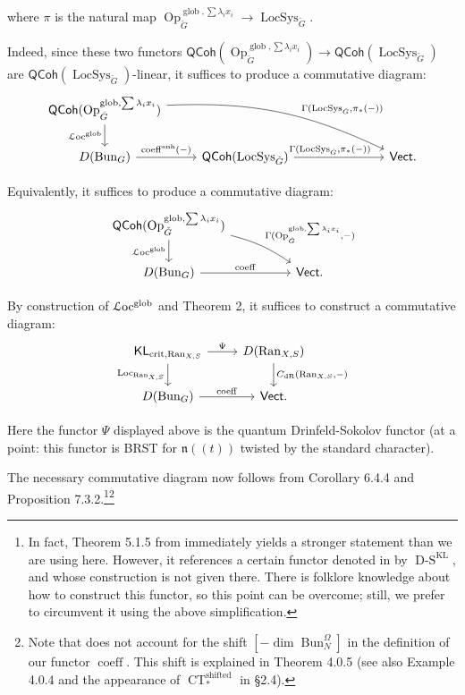 \documentclass[reqno,11pt]{amsart}
\numberwithin{equation}{subsection}
\theoremstyle{remark}
\newcommand{\Loc}{\on{Loc}}
\newcommand{\sL}{{\EuScript L}}
\newcommand{\fn}{{\mathfrak n}}
\newcommand{\on}{\operatorname}
\newcommand{\Vect}{\mathsf{Vect}}
\newcommand{\Bun}{\on{Bun}}
\newcommand{\LocSys}{\on{LocSys}}
\newcommand{\Op}{\on{Op}}
\newcommand{\QCoh}{\mathsf{QCoh}}
\newcommand{\coeff}{\on{coeff}}
\newcommand{\enh}{\on{enh}}
\newcommand{\Ran}{\on{Ran}}
\newcommand{\crit}{\on{crit}}
\newcommand{\KL}{\mathsf{KL}}
\newcommand{\dR}{\on{dR}}
\begin{document}
\noindent where $\pi$ is the natural map 
$\Op_{\check{G}}^{\on{glob},\sum \lambda_i x_i} \to \LocSys_{\check{G}}$.

Indeed, since these two functors 
$\QCoh(\Op_{\check{G}}^{\on{glob},\sum \lambda_i x_i}) \to 
\QCoh(\LocSys_{\check{G}})$ are $\QCoh(\LocSys_{\check{G}})$-linear,
it suffices to produce a commutative diagram:
%
\[
\begin{tikzcd}
\QCoh(\Op_{\check{G}}^{\on{glob},\sum \lambda_i x_i})
\arrow[d,swap,"\sL\text{oc}^{\on{glob}}"]
\arrow[drrrr, bend left = 14, pos = .6, "{\Gamma(\LocSys_{\check{G}},\pi_*(-))}"]
\\
D(\Bun_G)
\arrow[r,"{\coeff^{\enh}(-)}"]
&
\QCoh(\LocSys_{\check{G}})
\arrow[rrr,pos = .4,"{\Gamma(\LocSys_{\check{G}},\pi_*(-))}"]
&&&
\Vect.
\end{tikzcd}
\]

\noindent Equivalently, it suffices to produce a commutative diagram:
%
\[
\begin{tikzcd}
\QCoh(\Op_{\check{G}}^{\on{glob},\sum \lambda_i x_i})
\arrow[d,swap,"\sL\text{oc}^{\on{glob}}"]
\arrow[drr, bend left = 10, "{\Gamma(\Op_{\check{G}}^{\on{glob},\sum \lambda_i x_i},-)}"]
\\
D(\Bun_G)
\arrow[rr,"{\coeff}"]
&&
\Vect.
\end{tikzcd}
\]

By construction of $\sL\text{oc}^{\on{glob}}$ and 
\cite{fg-weyl} Theorem 2,
it suffices to construct a commutative diagram:
%
\[
\begin{tikzcd}
\KL_{\crit,\Ran_{X,S}}
\arrow[d,swap,"\Loc_{\Ran_{X,S}}"]
\arrow[r, "\Psi"]
&
D(\Ran_{X,S})
\arrow[d,"{C_{\dR}(\Ran_{X,S},-)}"]
\\
D(\Bun_G)
\arrow[r,"{\coeff}"]
&
\Vect.
\end{tikzcd}
\]

\noindent Here the functor $\Psi$ displayed above is the quantum Drinfeld-Sokolov
functor (at a point: this functor is BRST for $\fn((t))$ twisted by the standard 
character). 

The necessary commutative diagram now follows from 
\cite{dennis-opers} Corollary 6.4.4 and Proposition 7.3.2.\footnote{In fact,
Theorem 5.1.5 from \cite{dennis-opers} immediately yields a stronger
statement than we are using here. However, it references a certain
functor denoted in 
\cite{dennis-opers} by $\on{D-S}^{\on{KL}}$, and whose construction is not given
there. There is folklore knowledge about how to construct this functor,
so this point can be overcome; still, we prefer to circumvent it using 
the above simplification.}\footnote{Note that \cite{dennis-opers}
does not account for the shift $[-\dim \Bun_N^{\Omega}]$ in the 
definition of our functor $\coeff$. This shift is explained 
in \cite{charles-lin} Theorem 4.0.5 (see also \cite{charles-lin} Example 4.0.4
and the appearance of $\on{CT}_*^{\on{shifted}}$ in \S 2.4). }
\end{document}
